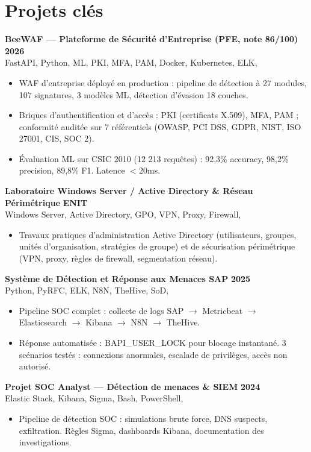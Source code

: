 \documentclass[a4paper,9pt]{article}
\newcommand{\cventry}[4]{\textbf{#1} \hfill \textbf{#4}\\[0.2pt]#2{\ifx\relax#3\relax\else, #3\fi}\par\vspace{0.3pt}}
\begin{document}
\section{Projets clés}
\cventry{BeeWAF --- Plateforme de Sécurité d'Entreprise (PFE, note 86/100)}{FastAPI, Python, ML, PKI, MFA, PAM, Docker, Kubernetes, ELK}{}{2026}
\begin{itemize}
  \item WAF d'entreprise déployé en production : pipeline de détection à 27 modules, 107 signatures, 3 modèles ML, détection d'évasion 18 couches.
  \item Briques d'authentification et d'accès : PKI (certificats X.509), MFA, PAM ; conformité auditée sur 7 référentiels (OWASP, PCI DSS, GDPR, NIST, ISO 27001, CIS, SOC 2).
  \item Évaluation ML sur CSIC 2010 (12 213 requêtes) : 92,3\% accuracy, 98,2\% precision, 89,8\% F1. Latence $<$20ms.
\end{itemize}
\cventry{Laboratoire Windows Server / Active Directory \& Réseau Périmétrique}{Windows Server, Active Directory, GPO, VPN, Proxy, Firewall}{}{ENIT}
\begin{itemize}
  \item Travaux pratiques d'administration Active Directory (utilisateurs, groupes, unités d'organisation, stratégies de groupe) et de sécurisation périmétrique (VPN, proxy, règles de firewall, segmentation réseau).
\end{itemize}
\cventry{Système de Détection et Réponse aux Menaces SAP}{Python, PyRFC, ELK, N8N, TheHive, SoD}{}{2025}
\begin{itemize}
  \item Pipeline SOC complet : collecte de logs SAP $\rightarrow$ Metricbeat $\rightarrow$ Elasticsearch $\rightarrow$ Kibana $\rightarrow$ N8N $\rightarrow$ TheHive.
  \item Réponse automatisée : BAPI\_USER\_LOCK pour blocage instantané. 3 scénarios testés : connexions anormales, escalade de privilèges, accès non autorisé.
\end{itemize}
\cventry{Projet SOC Analyst --- Détection de menaces \& SIEM}{Elastic Stack, Kibana, Sigma, Bash, PowerShell}{}{2024}
\begin{itemize}
  \item Pipeline de détection SOC : simulations brute force, DNS suspects, exfiltration. Règles Sigma, dashboards Kibana, documentation des investigations.
\end{itemize}
\end{document}

